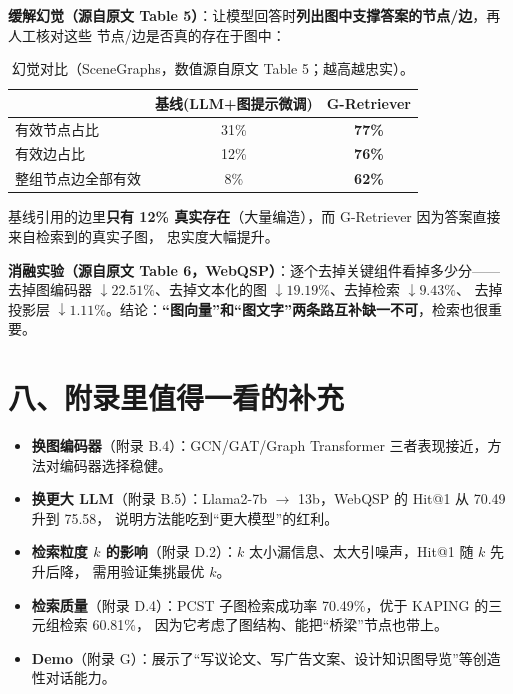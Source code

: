 \documentclass[11pt,UTF8,fontset=fandol]{ctexart}
\begin{document}
\textbf{缓解幻觉（源自原文 Table 5）}：让模型回答时\textbf{列出图中支撑答案的节点/边}，再人工核对这些
节点/边是否真的存在于图中：

\begin{table}[H]\centering
\caption{幻觉对比（SceneGraphs，数值源自原文 Table 5；越高越忠实）。}
\begin{tabular}{lcc}
\toprule
 & 基线(LLM+图提示微调) & G-Retriever \\
\midrule
有效节点占比 & 31\% & \textbf{77\%} \\
有效边占比 & 12\% & \textbf{76\%} \\
整组节点边全部有效 & 8\% & \textbf{62\%} \\
\bottomrule
\end{tabular}
\end{table}

基线引用的边里\textbf{只有 12\% 真实存在}（大量编造），而 G-Retriever 因为答案直接来自检索到的真实子图，
忠实度大幅提升。

\textbf{消融实验（源自原文 Table 6，WebQSP）}：逐个去掉关键组件看掉多少分——
去掉图编码器 $\downarrow 22.51\%$、去掉文本化的图 $\downarrow 19.19\%$、去掉检索 $\downarrow 9.43\%$、
去掉投影层 $\downarrow 1.11\%$。结论：\textbf{“图向量”和“图文字”两条路互补缺一不可}，检索也很重要。

\section{八、附录里值得一看的补充}
\begin{itemize}[leftmargin=2em]
  \item \textbf{换图编码器}（附录 B.4）：GCN/GAT/Graph Transformer 三者表现接近，方法对编码器选择稳健。
  \item \textbf{换更大 LLM}（附录 B.5）：Llama2-7b $\to$ 13b，WebQSP 的 Hit@1 从 70.49 升到 75.58，
        说明方法能吃到“更大模型”的红利。
  \item \textbf{检索粒度 $k$ 的影响}（附录 D.2）：$k$ 太小漏信息、太大引噪声，Hit@1 随 $k$ 先升后降，
        需用验证集挑最优 $k$。
  \item \textbf{检索质量}（附录 D.4）：PCST 子图检索成功率 70.49\%，优于 KAPING 的三元组检索 60.81\%，
        因为它考虑了图结构、能把“桥梁”节点也带上。
  \item \textbf{Demo}（附录 G）：展示了“写议论文、写广告文案、设计知识图导览”等创造性对话能力。
\end{itemize}
\end{document}
